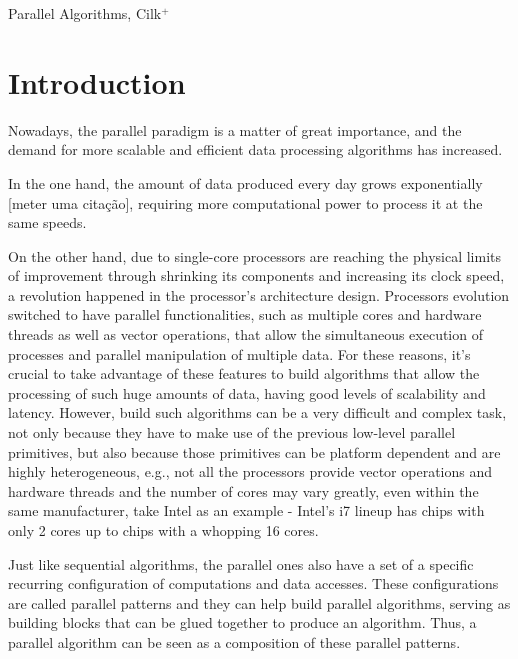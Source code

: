 \documentclass[conference,compsoc]{IEEEtran}
\begin{document}
\begin{abstract}
\end{abstract}

\IEEEpeerreviewmaketitle

\begin{IEEEkeywords}
Parallel Algorithms, Cilk$^+$
\end{IEEEkeywords}%


\section{Introduction}

Nowadays, the parallel paradigm is a matter of great importance, and the demand for more scalable and efficient data processing algorithms has increased.

In the one hand, the amount of data produced every day grows exponentially [meter uma citação], requiring more computational power to process it at the same speeds.

On the other hand, due to single-core processors are reaching the physical limits of improvement through shrinking its components and increasing its clock speed, a revolution happened in the processor's architecture design. Processors evolution switched to have parallel functionalities, such as multiple cores and hardware threads as well as vector operations, that allow the simultaneous execution of processes and parallel manipulation of multiple data.
For these reasons, it's crucial to take advantage of these features to build algorithms that allow the processing of such huge amounts of data, having good levels of scalability and latency. However, build such algorithms can be a very difficult and complex task, not only because they have to make use of the previous low-level parallel primitives,
but also because those primitives can be platform dependent and are highly heterogeneous, e.g., not all the processors provide vector operations and hardware threads and the number of cores may vary greatly, even within the same manufacturer, take Intel as an example - Intel's i7 lineup has chips with only 2 cores up to chips with a whopping 16 cores.

Just like sequential algorithms, the parallel ones also have a set of a specific recurring configuration of computations and data accesses. These configurations are called parallel patterns \cite{mccool2010structured} and they can help build parallel algorithms, serving as building blocks that can be glued together to produce an algorithm. Thus, a parallel algorithm can be seen as a composition of these parallel patterns.
\end{document}
